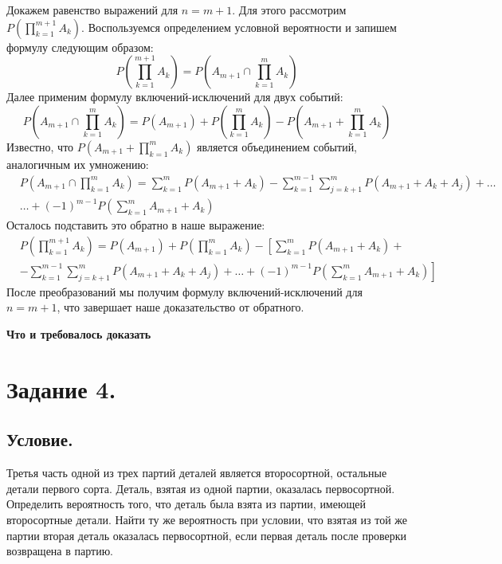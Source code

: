 \documentclass[a4paper, 12pt]{article}
\begin{document}
    Докажем равенство выражений для $n=m+1$. Для этого рассмотрим $P\left(\prod_{k=1}^{m+1}A_k\right)$.
    Воспользуемся определением условной вероятности и запишем формулу следующим образом:
    $$
    P\left(\prod_{k=1}^{m+1}A_k\right)=P\left(A_{m+1}\cap \prod_{k=1}^{m}A_k\right)
    $$
    Далее применим формулу включений-исключений для двух событий:
    $$
    P\left(A_{m+1}\cap \prod_{k=1}^{m}A_k\right)=P(A_{m+1})+P\left(\prod_{k=1}^{m}A_k\right)-P\left(A_{m+1}+\prod_{k=1}^{m}A_k\right)
    $$
    Известно, что $P\left(A_{m+1}+\prod_{k=1}^{m}A_{k}\right)$ является объединением событий, аналогичным их умножению:
    \begin{align*}
    &P\left(A_{m+1}\cap \prod_{k=1}^{m}A_k\right)=\sum\limits_{k=1}^{m}P(A_{m+1}+A_{k})-\sum\limits_{k=1}^{m-1}\sum\limits_{j=k+1}^{m}P(A_{m+1}+A_{k}+A_{j})
    +\hdots\\ &\hdots +(-1)^{m-1}P\left(\sum\limits_{k=1}^{m}A_{m+1}+A_{k}\right)
    \end{align*}
    Осталось подставить это обратно в наше выражение:
    \begin{align*}
        & P\left(\prod_{k=1}^{m+1}A_k\right)=P(A_{m+1})+P\left(\prod_{k=1}^{m}A_{k}\right)-\left[\sum\limits_{k=1}^{m}P(A_{m+1}+A_{k})+\right.\\
        & \left.-\sum\limits_{k=1}^{m-1}\sum\limits_{j=k+1}^{m}P(A_{m+1}+A_{k}+A_{j})+\hdots+(-1)^{m-1}P\left(\sum\limits_{k=1}^{m}A_{m+1}+A_{k}\right)\right]
    \end{align*}
    После преобразований мы получим формулу включений-исключений для $n=m+1$, что завершает наше доказательство от обратного.

    
    \textbf{Что и требовалось доказать}


    \section{Задание 4.}
    \subsection{Условие.}
    Третья часть одной из трех партий деталей является второсортной, остальные детали первого сорта. Деталь, взятая из одной партии,
    оказалась первосортной. Определить вероятность того, что деталь была взята из партии, имеющей второсортные детали. Найти ту же
    вероятность при условии, что взятая из той же партии вторая деталь оказалась первосортной, если первая деталь после проверки 
    возвращена в партию.
\end{document}

